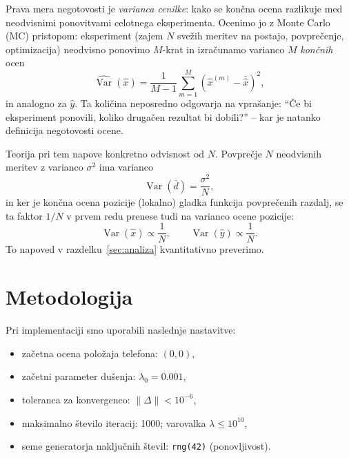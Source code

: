 \documentclass[a4paper,11pt]{article}
\begin{document}
Prava mera negotovosti je \emph{varianca cenilke}: kako se končna ocena razlikuje med neodvisnimi ponovitvami celotnega eksperimenta. Ocenimo jo z Monte Carlo (MC) pristopom: eksperiment (zajem $N$ svežih meritev na postajo, povprečenje, optimizacija) neodvisno ponovimo $M$-krat in izračunamo varianco $M$ \emph{končnih} ocen
\[
\widehat{\operatorname{Var}}(\hat{x}) = \frac{1}{M-1}\sum_{m=1}^{M}\left(\hat{x}^{(m)} - \bar{\hat{x}}\right)^2,
\]
in analogno za $\hat{y}$. Ta količina neposredno odgovarja na vprašanje: ``Če bi eksperiment ponovili, koliko drugačen rezultat bi dobili?'' -- kar je natanko definicija negotovosti ocene.

Teorija pri tem napove konkretno odvisnost od $N$. Povprečje $N$ neodvisnih meritev z varianco $\sigma^2$ ima varianco
\[
\operatorname{Var}(\bar{d}) = \frac{\sigma^2}{N},
\]
in ker je končna ocena pozicije (lokalno) gladka funkcija povprečenih razdalj, se ta faktor $1/N$ v prvem redu prenese tudi na varianco ocene pozicije:
\begin{equation}
\operatorname{Var}(\hat{x}) \propto \frac{1}{N}, \qquad \operatorname{Var}(\hat{y}) \propto \frac{1}{N}.
\label{eq:oneOverN}
\end{equation}
To napoved v razdelku~\ref{sec:analiza} kvantitativno preverimo.

\section{Metodologija}
Pri implementaciji smo uporabili naslednje nastavitve:
\begin{itemize}
    \item začetna ocena položaja telefona: $(0,0)$,
    \item začetni parameter dušenja: $\lambda_0 = 0.001$,
    \item toleranca za konvergenco: $\|\Delta\| < 10^{-6}$,
    \item maksimalno število iteracij: 1000; varovalka $\lambda \le 10^{10}$,
    \item seme generatorja naključnih števil: \texttt{rng(42)} (ponovljivost).
\end{itemize}
\end{document}
